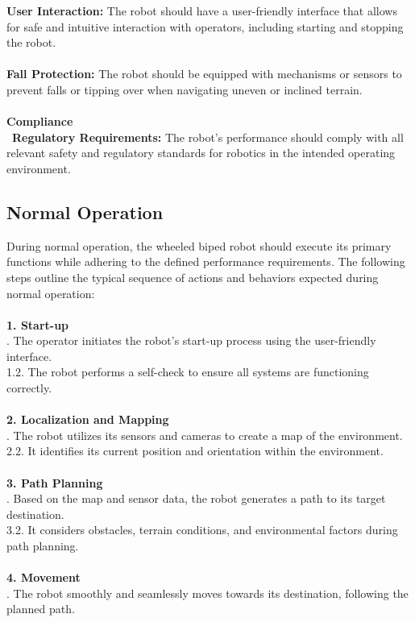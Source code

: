 \documentclass[12pt]{article}
\begin{document}
\noindent\textbf{User Interaction:} The robot should have a user-friendly interface that allows for safe and intuitive interaction with operators, including starting and stopping the robot.\\\\
\noindent\textbf{Fall Protection:} The robot should be equipped with mechanisms or sensors to prevent falls or tipping over when navigating uneven or inclined terrain.\\\\
\textbf{Compliance}\\\
\noindent\textbf{Regulatory Requirements:} The robot's performance should comply with all relevant safety and regulatory standards for robotics in the intended operating environment.
\subsection{Normal Operation}
\noindent During normal operation, the wheeled biped robot should execute its primary functions while adhering to the defined performance requirements. The following steps outline the typical sequence of actions and behaviors expected during normal operation:\\\\
\noindent\textbf{1. Start-up}\\
. The operator initiates the robot's start-up process using the user-friendly interface.\\
1.2. The robot performs a self-check to ensure all systems are functioning correctly.\\\\
\noindent\textbf{2. Localization and Mapping}\\
. The robot utilizes its sensors and cameras to create a map of the environment.\\
2.2. It identifies its current position and orientation within the environment.\\\\
\noindent\textbf{3. Path Planning}\\
. Based on the map and sensor data, the robot generates a path to its target destination.\\
3.2. It considers obstacles, terrain conditions, and environmental factors during path planning.\\\\
\noindent\textbf{4. Movement}\\
. The robot smoothly and seamlessly moves towards its destination, following the planned path.\\
\end{document}
